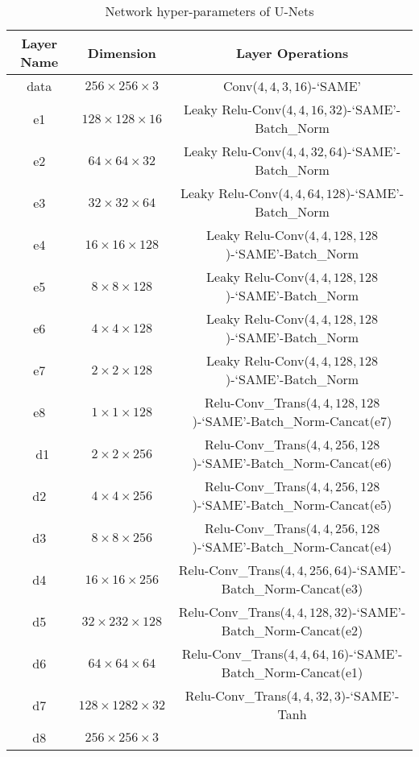 \documentclass[10pt,twocolumn,letterpaper]{article}
\begin{document}
\begin{appendices}
\begin{table*}[h]
\centering
\caption{Network hyper-parameters of U-Nets}
\begin{tabular}{ |c|c|c| } 
\hline
Layer Name &  Dimension    & Layer  Operations                                                     \\
\hline
data  & $256 \times 256 \times 3$    & Conv($4,4,3,16$)-`SAME'                           \\
e1    & $128 \times 128 \times 16$   & Leaky Relu-Conv($4,4,16,32$)-`SAME'-Batch\_Norm   \\
e2    & $64 \times 64 \times 32$     & Leaky Relu-Conv($4,4,32,64$)-`SAME'-Batch\_Norm   \\
e3    & $32 \times 32 \times 64$     & Leaky Relu-Conv($4,4,64,128$)-`SAME'-Batch\_Norm  \\
e4    & $16 \times 16 \times 128$    & Leaky Relu-Conv($4,4,128,128$)-`SAME'-Batch\_Norm \\
e5    & $8 \times 8 \times 128$      & Leaky Relu-Conv($4,4,128,128$)-`SAME'-Batch\_Norm \\
e6    & $4 \times 4 \times 128$      & Leaky Relu-Conv($4,4,128,128$)-`SAME'-Batch\_Norm  \\
e7    & $2 \times 2 \times 128$      & Leaky Relu-Conv($4,4,128,128$)-`SAME'-Batch\_Norm  \\
e8    & $1 \times 1 \times 128$      & Relu-Conv\_Trans($4,4,128,128$)-`SAME'-Batch\_Norm-Cancat(e7)  \\\
d1    & $2 \times 2 \times 256$      & Relu-Conv\_Trans($4,4,256,128$)-`SAME'-Batch\_Norm-Cancat(e6)  \\
d2    & $4 \times 4 \times 256$      & Relu-Conv\_Trans($4,4,256,128$)-`SAME'-Batch\_Norm-Cancat(e5) \\
d3    & $8 \times 8 \times 256$      & Relu-Conv\_Trans($4,4,256,128$)-`SAME'-Batch\_Norm-Cancat(e4) \\
d4    & $16 \times 16 \times 256$    & Relu-Conv\_Trans($4,4,256,64$)-`SAME'-Batch\_Norm-Cancat(e3) \\
d5    & $32 \times 232\times 128$    & Relu-Conv\_Trans($4,4,128,32$)-`SAME'-Batch\_Norm-Cancat(e2) \\
d6    & $64 \times 64 \times 64$     & Relu-Conv\_Trans($4,4,64,16$)-`SAME'-Batch\_Norm-Cancat(e1) \\
d7    & $128 \times 1282 \times 32$  & Relu-Conv\_Trans($4,4,32,3$)-`SAME'-Tanh \\
d8    & $256 \times 256 \times 3$    & \\
\hline
\end{tabular}\label{tab:unet}
\end{table*}


\end{appendices}
\end{document}
